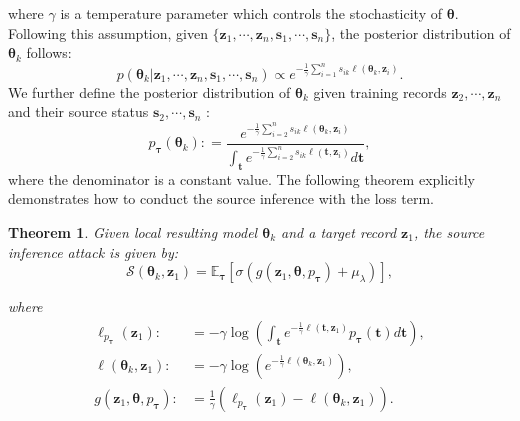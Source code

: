 \documentclass[10pt,journal,compsoc]{IEEEtran}
\newtheorem{theorem}{Theorem}
\begin{document}
\noindent where $\gamma$ is a temperature parameter which controls the stochasticity of $\bm{\theta}$. Following this assumption, given $\{\bm{z}_1,\cdots,\bm{z}_n,\bm{s}_1,\cdots,\bm{s}_n \}$, the posterior distribution of $\bm{\theta}_k$ follows:
\begin{equation}
    p({\bm{\theta} _k}|{\bm{z}_1}, \cdots ,{\bm{z}_n},{\bm{s}_1}, \cdots ,{\bm{s}_n}) \propto {e^{ - \frac{1}{\gamma }\sum\nolimits_{i = 1}^n {{s_{ik}}\ell (\bm{\theta}_k ,{\bm{z}_i})} }}.
\end{equation}
We further define the posterior distribution of $\bm{\theta}_k$ given training records $\bm{z}_2,\cdots,\bm{z}_n$ and their source status $\bm{s}_2,\cdots,\bm{s}_n$ :
\begin{equation}
    {p_{\bm{\tau}} }({\bm{\theta} _k}): = \frac{{{e^{ - \frac{1}{\gamma }\sum\nolimits_{i = 2}^n {{s_{ik}}\ell (\bm{\theta}_k ,{\bm{z}_i})} }}}}{{\int_{\bm{t}} {{e^{ - \frac{1}{\gamma }\sum\nolimits_{i = 2}^n {{s_{ik}}\ell (\bm{t} ,{\bm{z}_i})} }}} d\bm{t}}},
\end{equation}
where the denominator is a constant value. The following theorem explicitly demonstrates how to conduct the source inference with the loss term.
\begin{theorem}\label{theo::opt}
Given local resulting model $\bm{\theta}_k$ and a target record $\bm{z}_1$, the source inference attack is given by:
\begin{equation}\label{eqn::explicit-sia}
    \mathcal{S}({\bm{\theta} _k},{\bm{z}_1}) = {\mathbb{E}_{\bm{\tau}} }\left[ {\sigma \left( {g({\bm{z}_1},\bm{\theta} ,{p_{\bm{\tau}} }) + {\mu _\lambda }} \right)} \right],
\end{equation}

\noindent where
\begin{align}
{\ell _{{p_{\bm{\tau}} }}}({\bm{z}_1}): &=  - \gamma \log \left( {\int_{\bm{t}} {{e^{ - \frac{1}{\gamma }\ell (\bm{t},{\bm{z}_1})}}} {p_{\bm{\tau}} }(\bm{t})d\bm{t}} \right) \label{loss_other},\\
\ell (\bm{\theta}_k,{\bm{z}_1}): &=  - \gamma \log \left( {{e^{ - \frac{1}{\gamma }\ell ({\bm{\theta}_k},{\bm{z}_1})}}} \right) \label{loss_k}, \\
g({\bm{z}_1},\bm{\theta} ,{p_{\bm{\tau}} }): &= \frac{1}{\gamma }({\ell _{{p_{\bm{\tau}} }}}({\bm{z}_1}) - \ell ({\bm{\theta} _k},{\bm{z}_1})). \label{gap}
\end{align}
\end{theorem}
\end{document}
